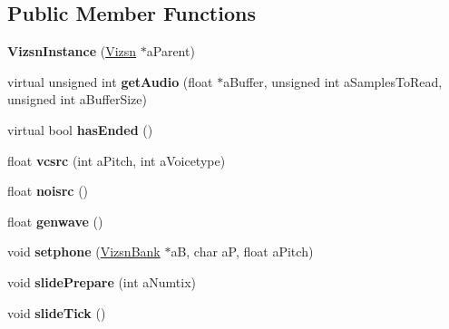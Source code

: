 \subsection*{Public Member Functions}
\begin{DoxyCompactItemize}
\item 
\mbox{\label{class_so_loud_1_1_vizsn_instance_a71faee929aab7331344e670203c19757}} 
{\bfseries Vizsn\+Instance} (\mbox{\hyperlink{class_so_loud_1_1_vizsn}{Vizsn}} $\ast$a\+Parent)
\item 
\mbox{\label{class_so_loud_1_1_vizsn_instance_a46cd3e0b5b9c19fd061b37bfa1bc3029}} 
virtual unsigned int {\bfseries get\+Audio} (float $\ast$a\+Buffer, unsigned int a\+Samples\+To\+Read, unsigned int a\+Buffer\+Size)
\item 
\mbox{\label{class_so_loud_1_1_vizsn_instance_a964d8b02914dbd77ff218ed0bd7942f7}} 
virtual bool {\bfseries has\+Ended} ()
\item 
\mbox{\label{class_so_loud_1_1_vizsn_instance_a9982d49b9f424e59fa1c220358c97e9b}} 
float {\bfseries vcsrc} (int a\+Pitch, int a\+Voicetype)
\item 
\mbox{\label{class_so_loud_1_1_vizsn_instance_ac042ac1b8c7fe3ab78706e460824193a}} 
float {\bfseries noisrc} ()
\item 
\mbox{\label{class_so_loud_1_1_vizsn_instance_a09a129caeb1bb46096392617874ae077}} 
float {\bfseries genwave} ()
\item 
\mbox{\label{class_so_loud_1_1_vizsn_instance_a5ce14ec8a36c6d82a407f1473ccbd9f3}} 
void {\bfseries setphone} (\mbox{\hyperlink{struct_so_loud_1_1_vizsn_bank}{Vizsn\+Bank}} $\ast$aB, char aP, float a\+Pitch)
\item 
\mbox{\label{class_so_loud_1_1_vizsn_instance_a7af97b0c1cd9f9a4f416834ae2b6ef57}} 
void {\bfseries slide\+Prepare} (int a\+Numtix)
\item 
\mbox{\label{class_so_loud_1_1_vizsn_instance_aec2d139411c46b19003722a233629290}} 
void {\bfseries slide\+Tick} ()
\end{DoxyCompactItemize}
